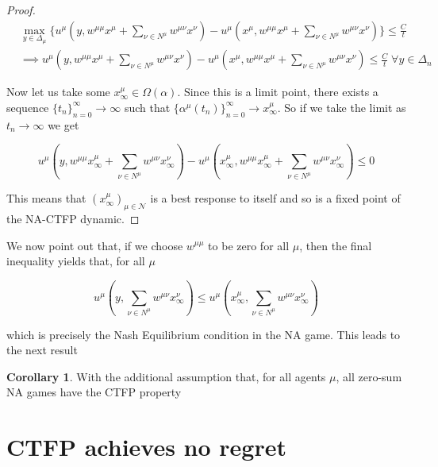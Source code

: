 \documentclass{article}
\theoremstyle{definition}
\newtheorem{corollary}{Corollary}
\newcommand{\agentset}{\mathcal{N}}
\newcommand{\wmunu}{w^{\mu \nu}}
\newcommand{\xmu}{x^{\mu}}
\newcommand{\xnu}{x^{\nu}}
\begin{document}
\begin{proof}
    \begin{align}
      & \max_{y \in \Delta_\mu} \{u^\mu(y, w^{\mu \mu} \xmu + \sum_{\nu \in N^\mu} \wmunu \xnu) - u^\mu(\xmu, w^{\mu \mu} \xmu + \sum_{\nu \in N^\mu} \wmunu \xnu) \} \leq \frac{C}{t}\\
      & \implies u^\mu(y, w^{\mu \mu} \xmu + \sum_{\nu \in N^\mu} \wmunu \xnu) - u^\mu(\xmu, w^{\mu \mu} \xmu + \sum_{\nu \in N^\mu} \wmunu \xnu) \leq \frac{C}{t} \; \forall y \in \Delta_n
    \end{align}
    
    Now let us take some $\xmu_\infty \in \Omega(\alpha)$. Since this is a limit point, there exists a sequence $\{t_n\}_{n = 0}^\infty \rightarrow \infty$ such that $\{\alpha^\mu(t_n)\}_{n = 0}^{\infty} \rightarrow \xmu_\infty$. So if we take the limit as $t_n \rightarrow \infty$ we get

    \begin{equation}
      u^\mu(y, w^{\mu \mu} \xmu_\infty + \sum_{\nu \in N^\mu} \wmunu \xnu_\infty) - u^\mu(\xmu_\infty, w^{\mu \mu} \xmu_\infty + \sum_{\nu \in N^\mu} \wmunu \xnu_\infty) \leq 0
    \end{equation}

    This means that $(\xmu_\infty)_{\mu \in \agentset}$ is a best response to itself and so is a fixed point of the NA-CTFP dynamic. 
  \end{proof}

  We now point out that, if we choose $w^{\mu \mu}$ to be zero for all $\mu$, then the final inequality yields that, for all $\mu$

  \begin{equation}
    u^\mu(y, \sum_{\nu \in N^\mu} \wmunu \xnu_\infty) \leq u^\mu(\xmu_\infty, \sum_{\nu \in N^\mu} \wmunu \xnu_\infty)
  \end{equation}

  which is precisely the Nash Equilibrium condition in the NA game. This leads to the next result

  \begin{corollary}
    With the additional assumption that, for all agents $\mu$, all zero-sum NA games have the CTFP property
  \end{corollary}

\section{CTFP achieves no regret}
  \label{sec::CCEConvergence}
\end{document}

